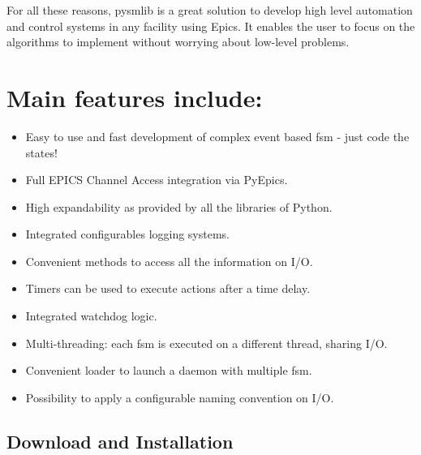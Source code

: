\documentclass[letterpaper,10pt,english]{sphinxmanual}
\begin{document}
For all these reasons, pysmlib is a great solution to develop high level
automation and control systems in any facility using Epics. It enables
the user to focus on the algorithms to implement without worrying about low-level
problems.


\chapter{Main features include:}
\label{\detokenize{index:main-features-include}}\begin{itemize}
\item {} 
Easy to use and fast development of complex event based fsm - just code the states!

\item {} 
Full EPICS Channel Access integration via PyEpics.

\item {} 
High expandability as provided by all the libraries of Python.

\item {} 
Integrated configurables logging systems.

\item {} 
Convenient methods to access all the information on I/O.

\item {} 
Timers can be used to execute actions after a time delay.

\item {} 
Integrated watchdog logic.

\item {} 
Multi-threading: each fsm is executed on a different thread, sharing I/O.

\item {} 
Convenient loader to launch a daemon with multiple fsm.

\item {} 
Possibility to apply a configurable naming convention on I/O.

\end{itemize}


\section{Download and Installation}
\label{\detokenize{installation:download-and-installation}}\label{\detokenize{installation:id1}}\label{\detokenize{installation::doc}}
\end{document}
